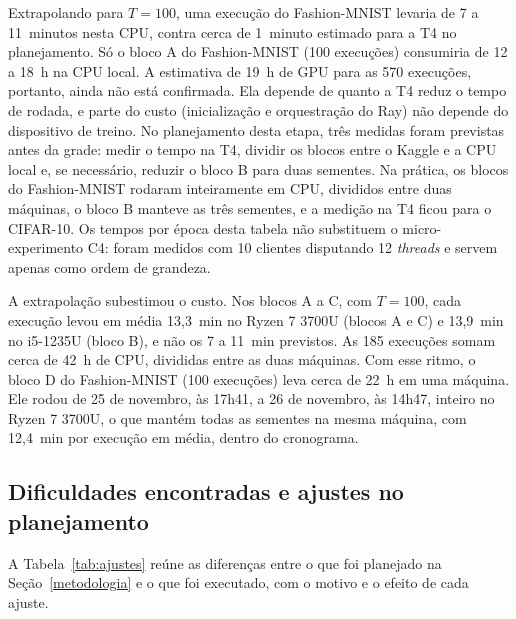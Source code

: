 Extrapolando para $T = 100$, uma execução do Fashion-MNIST levaria de 7 a 11~minutos nesta CPU, contra cerca de 1~minuto estimado para a T4 no planejamento. Só o bloco A do Fashion-MNIST (100 execuções) consumiria de 12 a 18~h na CPU local. A estimativa de 19~h de GPU para as 570 execuções, portanto, ainda não está confirmada. Ela depende de quanto a T4 reduz o tempo de rodada, e parte do custo (inicialização e orquestração do Ray) não depende do dispositivo de treino. No planejamento desta etapa, três medidas foram previstas antes da grade: medir o tempo na T4, dividir os blocos entre o Kaggle e a CPU local e, se necessário, reduzir o bloco B para duas sementes. Na prática, os blocos do Fashion-MNIST rodaram inteiramente em CPU, divididos entre duas máquinas, o bloco B manteve as três sementes, e a medição na T4 ficou para o CIFAR-10. Os tempos por época desta tabela não substituem o micro-experimento C4: foram medidos com 10 clientes disputando 12 \textit{threads} e servem apenas como ordem de grandeza.

A extrapolação subestimou o custo. Nos blocos A a C, com $T = 100$, cada execução levou em média 13,3~min no Ryzen 7 3700U (blocos A e C) e 13,9~min no i5-1235U (bloco B), e não os 7 a 11~min previstos. As 185 execuções somam cerca de 42~h de CPU, divididas entre as duas máquinas. Com esse ritmo, o bloco D do Fashion-MNIST (100 execuções) leva cerca de 22~h em uma máquina. Ele rodou de 25 de novembro, às 17h41, a 26 de novembro, às 14h47, inteiro no Ryzen 7 3700U, o que mantém todas as sementes na mesma máquina, com 12,4~min por execução em média, dentro do cronograma.

\subsection{Dificuldades encontradas e ajustes no planejamento}
\label{sec:ajustes}

A Tabela~\ref{tab:ajustes} reúne as diferenças entre o que foi planejado na Seção~\ref{metodologia} e o que foi executado, com o motivo e o efeito de cada ajuste.

